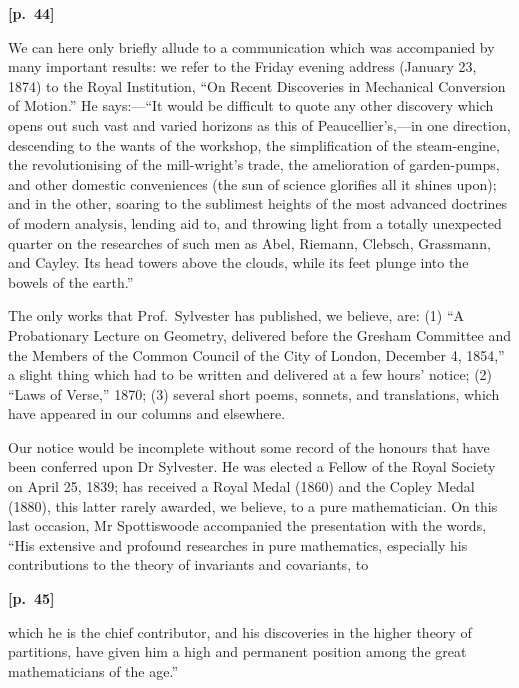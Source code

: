 \documentclass[11pt,a4paper]{article}
\theoremstyle{plain}
\begin{document}
\vspace{0.5em}
\noindent\textbf{[p.\ 44]}

We can here only briefly allude to a communication which was accompanied by many important results: we refer to the Friday evening address (January 23, 1874) to the Royal Institution, ``On Recent Discoveries in Mechanical Conversion of Motion.'' He says:---``It would be difficult to quote any other discovery which opens out such vast and varied horizons as this of Peaucellier's,---in one direction, descending to the wants of the workshop, the simplification of the steam-engine, the revolutionising of the mill-wright's trade, the amelioration of garden-pumps, and other domestic conveniences (the sun of science glorifies all it shines upon); and in the other, soaring to the sublimest heights of the most advanced doctrines of modern analysis, lending aid to, and throwing light from a totally unexpected quarter on the researches of such men as Abel, Riemann, Clebsch, Grassmann, and Cayley. Its head towers above the clouds, while its feet plunge into the bowels of the earth.''

The only works that Prof.\ Sylvester has published, we believe, are: (1) ``A Probationary Lecture on Geometry, delivered before the Gresham Committee and the Members of the Common Council of the City of London, December 4, 1854,'' a slight thing which had to be written and delivered at a few hours' notice; (2) ``Laws of Verse,'' 1870; (3) several short poems, sonnets, and translations, which have appeared in our columns and elsewhere.

Our notice would be incomplete without some record of the honours that have been conferred upon Dr Sylvester. He was elected a Fellow of the Royal Society on April 25, 1839; has received a Royal Medal (1860) and the Copley Medal (1880), this latter rarely awarded, we believe, to a pure mathematician. On this last occasion, Mr Spottiswoode accompanied the presentation with the words, ``His extensive and profound researches in pure mathematics, especially his contributions to the theory of invariants and covariants, to

\vspace{0.5em}
\noindent\textbf{[p.\ 45]}

which he is the chief contributor, and his discoveries in the higher theory of partitions, have given him a high and permanent position among the great mathematicians of the age.''
\end{document}
